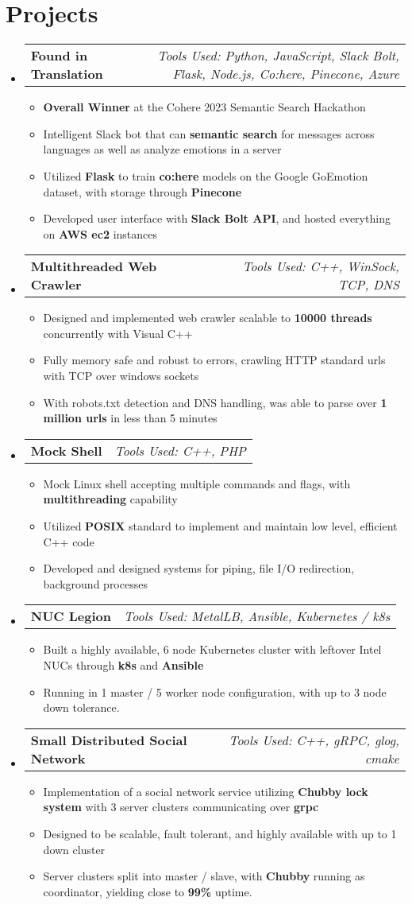 \documentclass[letterpaper,10pt]{article}
\makeatletter
\newcommand{\resumeItemDescription}[1]{
  \item\small{
    #1 \vspace{-2pt}
  }
}
\newcommand{\resumeProjectItem}[2]{
  \vspace{-1pt}\item
    \begin{tabular*}{0.97\textwidth}[t]{l@{\extracolsep{\fill}}r}
      \textbf{#1} & \textit{\small Tools Used: #2} \\
    \end{tabular*}\vspace{-5pt}
  }
\newcommand{\resumeProjectListStart}{\begin{itemize}[leftmargin=*]}
\newcommand{\resumeProjectListEnd}{\end{itemize}}
\newcommand{\resumeItemListStart}{\begin{itemize}}
\newcommand{\resumeItemListEnd}{\end{itemize}\vspace{-5pt}}
\makeatother
\begin{document}
\section{Projects} 
  \resumeProjectListStart 
    \resumeProjectItem{Found in Translation}{Python, JavaScript, Slack Bolt, Flask, Node.js, Co:here, Pinecone, Azure}
      \resumeItemListStart
        \resumeItemDescription{\textbf{Overall Winner} at the Cohere 2023 Semantic Search Hackathon}
        \resumeItemDescription{Intelligent Slack bot that can \textbf{semantic search} for messages across languages as well as analyze emotions in a server}
        \resumeItemDescription{Utilized \textbf{Flask} to train \textbf{co:here} models on the Google GoEmotion dataset, with storage through \textbf{Pinecone}}
        \resumeItemDescription{Developed user interface with \textbf{Slack Bolt API}, and hosted everything on \textbf{AWS ec2} instances}
      \resumeItemListEnd

\resumeProjectItem{Multithreaded Web Crawler}{C++, WinSock, TCP, DNS}
      \resumeItemListStart
        \resumeItemDescription{Designed and implemented web crawler scalable to \textbf{10000 threads} concurrently with Visual C++}
        \resumeItemDescription{Fully memory safe and robust to errors, crawling HTTP standard urls with TCP over windows sockets}
        \resumeItemDescription{With robots.txt detection and DNS handling, was able to parse over \textbf{1 million urls} in less than 5 minutes}
      \resumeItemListEnd

  \resumeProjectItem{Mock Shell}{C++, PHP}
      \resumeItemListStart
        \resumeItemDescription{Mock Linux shell accepting multiple commands and flags, with \textbf{multithreading} capability}
        \resumeItemDescription{Utilized \textbf{POSIX} standard to implement and maintain low level, efficient C++ code} 
        \resumeItemDescription{Developed and designed systems for piping, file I/O redirection, background processes}
      \resumeItemListEnd
   
   \resumeProjectItem{NUC Legion}{MetalLB, Ansible, Kubernetes / k8s}
      \resumeItemListStart
        \resumeItemDescription{Built a highly available, 6 node Kubernetes cluster with leftover Intel NUCs through \textbf{k8s} and \textbf{Ansible}}
        \resumeItemDescription{Running in 1 master / 5 worker node configuration, with up to 3 node down tolerance.}
      \resumeItemListEnd

    \resumeProjectItem{Small Distributed Social Network}{C++, gRPC, glog, cmake}
      \resumeItemListStart
        \resumeItemDescription{Implementation of a social network service utilizing \textbf{Chubby lock system} with 3 server clusters communicating over \textbf{grpc}}
        \resumeItemDescription{Designed to be scalable, fault tolerant, and highly available with up to 1 down cluster}
        \resumeItemDescription{Server clusters split into master / slave, with \textbf{Chubby} running as coordinator, yielding close to \textbf{99\%} uptime.}
      \resumeItemListEnd
  \resumeProjectListEnd
\end{document}

